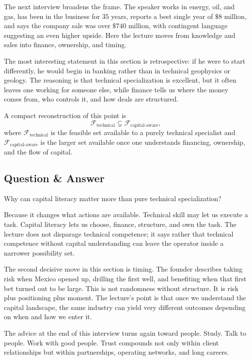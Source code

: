 The next interview broadens the frame. The speaker works in energy, oil, and gas, has been in the business for \(35\) years, reports a best single year of \(\$8\) million, and says the company sale was over \(\$740\) million, with contingent language suggesting an even higher upside. Here the lecture moves from knowledge and sales into finance, ownership, and timing.

The most interesting statement in this section is retrospective: if he were to start differently, he would begin in banking rather than in technical geophysics or geology. The reasoning is that technical specialization is excellent, but it often leaves one working for someone else, while finance tells us where the money comes from, who controls it, and how deals are structured.

A compact reconstruction of this point is
\begin{equation}
\mathcal{F}_{\text{technical}} \subsetneq \mathcal{F}_{\text{capital-aware}},
\end{equation}
where \(\mathcal{F}_{\text{technical}}\) is the feasible set available to a purely technical specialist and \(\mathcal{F}_{\text{capital-aware}}\) is the larger set available once one understands financing, ownership, and the flow of capital.

\subsection{Question \& Answer}

Why can capital literacy matter more than pure technical specialization?

Because it changes what actions are available. Technical skill may let us execute a task. Capital literacy lets us choose, finance, structure, and own the task. The lecture does not disparage technical competence; it says rather that technical competence without capital understanding can leave the operator inside a narrower possibility set.

The second decisive move in this section is timing. The founder describes taking risk when Mexico opened up, drilling the first well, and benefiting when that first bet turned out to be large. This is not randomness without structure. It is risk plus positioning plus moment. The lecture's point is that once we understand the capital landscape, the same industry can yield very different outcomes depending on when and how we enter it.

The advice at the end of this interview turns again toward people. Study. Talk to people. Work with good people. Trust compounds not only within client relationships but within partnerships, operating networks, and long careers.


